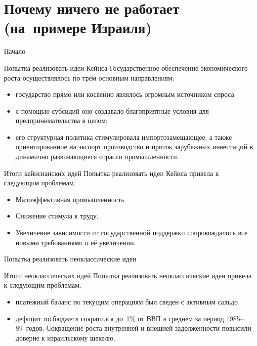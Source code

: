 \documentclass{beamer}
\begin{document}
	\section{Почему ничего не работает (на~примере Израиля)}

	\begin{frame}{Начало}
	
	\end{frame}
	
	\begin{frame}{Попытка реализовать идеи Кейнса}
		Государственное обеспечение экономического роста осуществлялось по трём основным направлениям:
		\begin{itemize}
		\item государство прямо или косвенно являлось огромным источником спроса
		\item с помощью субсидий оно создавало благоприятные условия для предпринимательства в целом;
		\item его структурная политика стимулировала импортозамещающее, а также ориентированное на экспорт производство и приток зарубежных инвестиций в динамично развивающиеся отрасли промышленности.
		\end{itemize}
	\end{frame}

	\begin{frame}{Итоги кейнсианских идей}
		Попытка реализовать идеи Кейнса привела к следующим проблемам.
		\begin{itemize}
			\item Малоэффективная промышленность.
			\item Снижение стимула к труду.
			\item Увеличение зависимости от государственной поддержки сопровождалось все новыми требованиями о её увеличении.
		\end{itemize}
	\end{frame}

	\begin{frame}{Попытка реализовать неоклассические идеи}
		
	\end{frame}
	
	\begin{frame}{Итоги неоклассических идей}
		Попытка реализовать неоклассические идеи привела к следующим проблемам.
		\begin{itemize}
			\item платёжный баланс по текущим операциям был сведен с активным сальдо
			\item дефицит госбюджета сократился до~1\% от ВВП в среднем за период 1985--89~годов.
			Сокращение роста внутренней и внешней задолженности повысили доверие к израильскому шекелю.
		\end{itemize}
	\end{frame}
\end{document}
